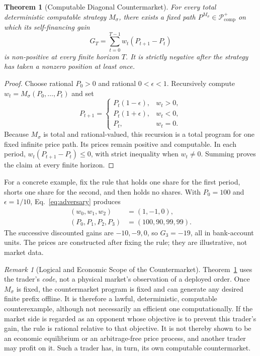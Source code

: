 \documentclass[aps,pra,reprint,superscriptaddress,amsmath,amssymb,floatfix]{revtex4-2}
\theoremstyle{plain}
\newtheorem{theorem}{Theorem}
\theoremstyle{definition}
\theoremstyle{remark}
\newtheorem{remark}{Remark}
\begin{document}
\begin{samepage}
\begin{theorem}[Computable Diagonal Countermarket]
  \label{thm:counterpath}
  For every total deterministic computable strategy \(M_\sigma\), there exists
  a fixed path \(P^{M_\sigma}\in\mathcal P_{\mathrm{comp}}^{+}\) on which its
  self-financing gain
  \[
    G_T=\sum_{t=0}^{T-1}w_t(P_{t+1}-P_t)
  \]
  is non-positive at every finite horizon \(T\). It is strictly negative after
  the strategy has taken a nonzero position at least once.
\end{theorem}
\end{samepage}

\begin{proof}
Choose rational \(P_0>0\) and rational \(0<\epsilon<1\). Recursively compute
\(w_t=M_\sigma(P_0,\ldots,P_t)\) and set
\begin{equation}
P_{t+1}=
\begin{cases}
P_t(1-\epsilon),&w_t>0,\\
P_t(1+\epsilon),&w_t<0,\\
P_t,&w_t=0.
\end{cases}
\label{eq:adversary}
\end{equation}
Because \(M_\sigma\) is total and rational-valued, this recursion is a total
program for one fixed infinite price path. Its prices remain positive and
computable. In each period,
\(w_t(P_{t+1}-P_t)\leq0\), with strict inequality when \(w_t\neq0\).
Summing proves the claim at every finite horizon.
\end{proof}

For a concrete example, fix the rule that holds one share for the first
period, shorts one share for the second, and then holds no shares. With
\(P_0=100\) and \(\epsilon=1/10\), Eq.~\eqref{eq:adversary} produces
\begin{align*}
  (w_0,w_1,w_2)&=(1,-1,0),\\
  (P_0,P_1,P_2,P_3)&=(100,90,99,99).
\end{align*}
The successive discounted gains are \(-10,-9,0\), so \(G_3=-19\), all in
bank-account units. The prices are constructed after fixing the rule; they
are illustrative, not market data.

\begin{remark}[Logical and Economic Scope of the Countermarket]
\label{rem:counterpath-scope}
Theorem~\ref{thm:counterpath} uses the trader's \emph{code}, not a physical
market's observation of a deployed order. Once \(M_\sigma\) is fixed, the
countermarket program is fixed and can generate any desired finite prefix
offline. It is therefore a lawful, deterministic, computable counterexample,
although not necessarily an efficient one computationally. If the market side
is regarded as an opponent whose objective is to prevent this trader's gain,
the rule is rational relative to that objective. It is not thereby shown to be
an economic equilibrium or an arbitrage-free price process, and another trader
may profit on it. Such a trader has, in turn, its own computable countermarket.
\end{remark}
\end{document}
